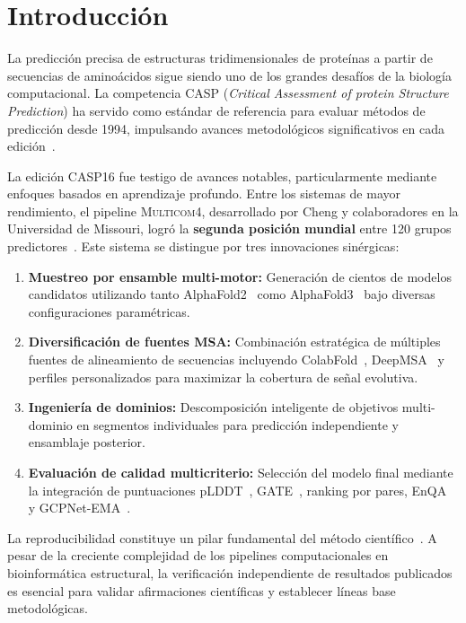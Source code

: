 \documentclass[10pt,twocolumn,a4paper]{article}
\newcommand{\aff}{AlphaFold2}
\newcommand{\afthree}{AlphaFold3}
\newcommand{\multicom}{\textsc{Multicom4}}
\begin{document}
\section{Introducción}

La predicción precisa de estructuras tridimensionales de proteínas a partir de secuencias de aminoácidos sigue siendo uno de los grandes desafíos de la biología computacional. La competencia CASP (\textit{Critical Assessment of protein Structure Prediction}) ha servido como estándar de referencia para evaluar métodos de predicción desde 1994, impulsando avances metodológicos significativos en cada edición~\cite{moult2024casp16}.

La edición CASP16 fue testigo de avances notables, particularmente mediante enfoques basados en aprendizaje profundo. Entre los sistemas de mayor rendimiento, el pipeline \multicom{}, desarrollado por Cheng y colaboradores en la Universidad de Missouri, logró la \textbf{segunda posición mundial} entre 120 grupos predictores~\cite{liu2025multicom4}. Este sistema se distingue por tres innovaciones sinérgicas:

\begin{enumerate}
    \item \textbf{Muestreo por ensamble multi-motor:} Generación de cientos de modelos candidatos utilizando tanto \aff{}~\cite{jumper2021alphafold} como \afthree{}~\cite{abramson2024alphafold3} bajo diversas configuraciones paramétricas.
    \item \textbf{Diversificación de fuentes MSA:} Combinación estratégica de múltiples fuentes de alineamiento de secuencias incluyendo ColabFold~\cite{mirdita2022colabfold}, DeepMSA~\cite{zhang2020deepmsa} y perfiles personalizados para maximizar la cobertura de señal evolutiva.
    \item \textbf{Ingeniería de dominios:} Descomposición inteligente de objetivos multi-dominio en segmentos individuales para predicción independiente y ensamblaje posterior.
    \item \textbf{Evaluación de calidad multicriterio:} Selección del modelo final mediante la integración de puntuaciones pLDDT~\cite{jumper2021alphafold}, GATE~\cite{chen2023gate}, ranking por pares, EnQA~\cite{chen2022enqa} y GCPNet-EMA~\cite{jing2023gcpnet}.
\end{enumerate}

La reproducibilidad constituye un pilar fundamental del método científico~\cite{baker2016reproducibility}. A pesar de la creciente complejidad de los pipelines computacionales en bioinformática estructural, la verificación independiente de resultados publicados es esencial para validar afirmaciones científicas y establecer líneas base metodológicas.
\end{document}
